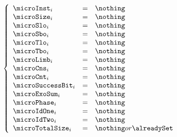 \[
	\left\{ \begin{array}{lcl}
		\microInst        _{i} & = & \nothing \\
		\microSize        _{i} & = & \nothing \\
		\microSlo         _{i} & = & \nothing \\
		\microSbo         _{i} & = & \nothing \\
		\microTlo         _{i} & = & \nothing \\
		\microTbo         _{i} & = & \nothing \\
		\microLimb        _{i} & = & \nothing \\
		\microCns         _{i} & = & \nothing \\
		\microCnt         _{i} & = & \nothing \\
		\microSuccessBit  _{i} & = & \nothing \\
		\microExoSum      _{i} & = & \nothing \\
		\microPhase       _{i} & = & \nothing \\
		\microIdOne       _{i} & = & \nothing \\
		\microIdTwo       _{i} & = & \nothing \\
		\microTotalSize   _{i} & = & \nothing or \alreadySet \\
	\end{array} \right.
\]
